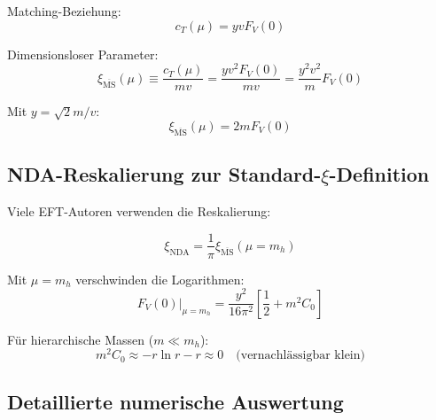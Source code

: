 	Matching-Beziehung:
	\begin{equation}
		c_T(\mu) = y v F_V(0)
	\end{equation}
	
	Dimensionsloser Parameter:
	\begin{equation}
		\xi_{\overline{\text{MS}}}(\mu) \equiv \frac{c_T(\mu)}{mv} = \frac{yv^2F_V(0)}{mv} = \frac{y^2v^2}{m}F_V(0)
	\end{equation}
	
	Mit $y = \sqrt{2} m/v$:
	\begin{equation}
		\xi_{\overline{\text{MS}}}(\mu) = 2mF_V(0)
	\end{equation}
	
	\subsection{NDA-Reskalierung zur Standard-$\xi$-Definition}
	
	Viele EFT-Autoren verwenden die Reskalierung:
	
	\begin{equation}
		\xi_{\text{NDA}} = \frac{1}{\pi} \xi_{\overline{\text{MS}}}(\mu = m_h)
	\end{equation}
	
	Mit $\mu = m_h$ verschwinden die Logarithmen:
	\begin{equation}
		F_V(0)|_{\mu=m_h} = \frac{y^2}{16\pi^2}\left[\frac{1}{2} + m^2C_0\right]
	\end{equation}
	
	Für hierarchische Massen ($m \ll m_h$):
	\begin{equation}
		m^2C_0 \approx -r \ln r - r \approx 0 \quad \text{(vernachlässigbar klein)}
	\end{equation}
	
	\subsection{Detaillierte numerische Auswertung}
	
